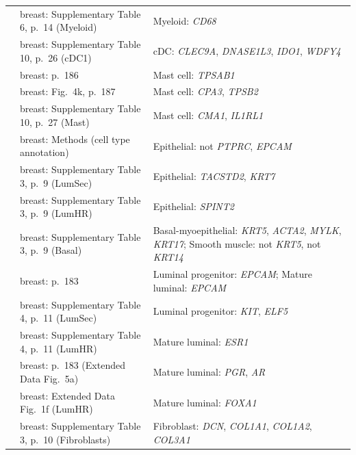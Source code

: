 \begin{longtable}{@{}>{\raggedright\arraybackslash}p{2.0cm} >{\raggedright\arraybackslash}p{4.6cm} >{\raggedright\arraybackslash}p{8.4cm}@{}}
\cite{kumarSpatiallyResolvedSinglecell2023} & breast: Supplementary Table 6, p.~14 (Myeloid) & Myeloid: \textit{CD68} \\
\cite{kumarSpatiallyResolvedSinglecell2023} & breast: Supplementary Table 10, p.~26 (cDC1) & cDC: \textit{CLEC9A}, \textit{DNASE1L3}, \textit{IDO1}, \textit{WDFY4} \\
\cite{kumarSpatiallyResolvedSinglecell2023} & breast: p.~186 & Mast cell: \textit{TPSAB1} \\
\cite{kumarSpatiallyResolvedSinglecell2023} & breast: Fig.~4k, p.~187 & Mast cell: \textit{CPA3}, \textit{TPSB2} \\
\cite{kumarSpatiallyResolvedSinglecell2023} & breast: Supplementary Table 10, p.~27 (Mast) & Mast cell: \textit{CMA1}, \textit{IL1RL1} \\
\cite{kumarSpatiallyResolvedSinglecell2023} & breast: Methods (cell type annotation) & Epithelial: not \textit{PTPRC}, \textit{EPCAM} \\
\cite{kumarSpatiallyResolvedSinglecell2023} & breast: Supplementary Table 3, p.~9 (LumSec) & Epithelial: \textit{TACSTD2}, \textit{KRT7} \\
\cite{kumarSpatiallyResolvedSinglecell2023} & breast: Supplementary Table 3, p.~9 (LumHR) & Epithelial: \textit{SPINT2} \\
\cite{kumarSpatiallyResolvedSinglecell2023} & breast: Supplementary Table 3, p.~9 (Basal) & Basal-myoepithelial: \textit{KRT5}, \textit{ACTA2}, \textit{MYLK}, \textit{KRT17}; Smooth muscle: not \textit{KRT5}, not \textit{KRT14} \\
\cite{kumarSpatiallyResolvedSinglecell2023} & breast: p.~183 & Luminal progenitor: \textit{EPCAM}; Mature luminal: \textit{EPCAM} \\
\cite{kumarSpatiallyResolvedSinglecell2023} & breast: Supplementary Table 4, p.~11 (LumSec) & Luminal progenitor: \textit{KIT}, \textit{ELF5} \\
\cite{kumarSpatiallyResolvedSinglecell2023} & breast: Supplementary Table 4, p.~11 (LumHR) & Mature luminal: \textit{ESR1} \\
\cite{kumarSpatiallyResolvedSinglecell2023} & breast: p.~183 (Extended Data Fig.~5a) & Mature luminal: \textit{PGR}, \textit{AR} \\
\cite{kumarSpatiallyResolvedSinglecell2023} & breast: Extended Data Fig.~1f (LumHR) & Mature luminal: \textit{FOXA1} \\
\cite{kumarSpatiallyResolvedSinglecell2023} & breast: Supplementary Table 3, p.~10 (Fibroblasts) & Fibroblast: \textit{DCN}, \textit{COL1A1}, \textit{COL1A2}, \textit{COL3A1} \\

\end{longtable}
